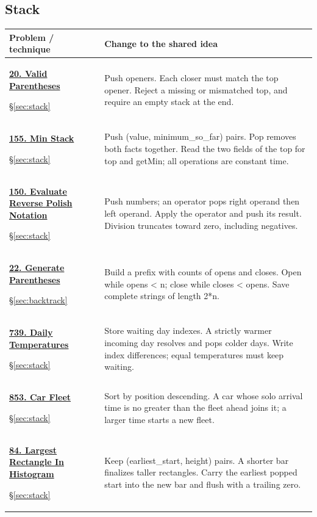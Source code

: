 \documentclass[11pt]{article}
\newcommand{\sect}[1]{\hyperref[sec:#1]{\S\ref*{sec:#1}}}
\begin{document}
\subsection{Stack}
\begin{longtable}{@{}L{4.3cm}L{11.7cm}@{}}
\toprule Problem / technique & Change to the shared idea \\ \midrule\endhead
\hypertarget{lc20}{}\href{https://leetcode.com/problems/valid-parentheses/}{\textbf{20. Valid Parentheses}}\par\sect{stack} & Push openers. Each closer must match the top opener. Reject a missing or mismatched top, and require an empty stack at the end.\\[4pt]
\hypertarget{lc155}{}\href{https://leetcode.com/problems/min-stack/}{\textbf{155. Min Stack}}\par\sect{stack} & Push (value, minimum\_so\_far) pairs. Pop removes both facts together. Read the two fields of the top for top and getMin; all operations are constant time.\\[4pt]
\hypertarget{lc150}{}\href{https://leetcode.com/problems/evaluate-reverse-polish-notation/}{\textbf{150. Evaluate Reverse Polish Notation}}\par\sect{stack} & Push numbers; an operator pops right operand then left operand. Apply the operator and push its result. Division truncates toward zero, including negatives.\\[4pt]
\hypertarget{lc22}{}\href{https://leetcode.com/problems/generate-parentheses/}{\textbf{22. Generate Parentheses}}\par\sect{backtrack} & Build a prefix with counts of opens and closes. Open while opens < n; close while closes < opens. Save complete strings of length 2*n.\\[4pt]
\hypertarget{lc739}{}\href{https://leetcode.com/problems/daily-temperatures/}{\textbf{739. Daily Temperatures}}\par\sect{stack} & Store waiting day indexes. A strictly warmer incoming day resolves and pops colder days. Write index differences; equal temperatures must keep waiting.\\[4pt]
\hypertarget{lc853}{}\href{https://leetcode.com/problems/car-fleet/}{\textbf{853. Car Fleet}}\par\sect{stack} & Sort by position descending. A car whose solo arrival time is no greater than the fleet ahead joins it; a larger time starts a new fleet.\\[4pt]
\hypertarget{lc84}{}\href{https://leetcode.com/problems/largest-rectangle-in-histogram/}{\textbf{84. Largest Rectangle In Histogram}}\par\sect{stack} & Keep (earliest\_start, height) pairs. A shorter bar finalizes taller rectangles. Carry the earliest popped start into the new bar and flush with a trailing zero.\\[4pt]
\bottomrule
\end{longtable}
\end{document}
